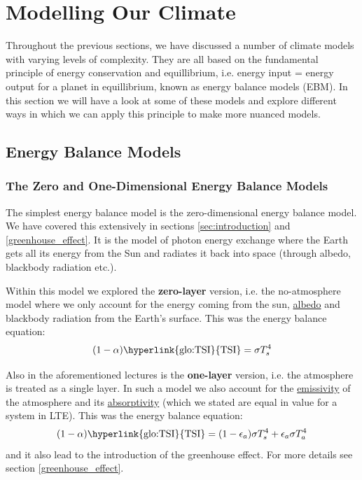 \section{Modelling Our Climate}
\label{sec:climate-modelling}

Throughout the previous sections, we have discussed a number of climate models
with varying levels of complexity. They are all based on the fundamental
principle of energy conservation and equillibrium, i.e. energy input = energy
output for a planet in equillibrium, known as energy balance models (\gls{EBM}).
In this section we will have a look at some
of these models and explore different ways in which we can apply this principle 
to make more nuanced models.

\subsection{Energy Balance Models}
\label{sec:EBM}

\subsubsection{The Zero and One-Dimensional Energy Balance Models}
\label{sec:0D-1D-EBM}

The simplest energy balance model is the zero-dimensional energy balance model. 
We have covered this extensively in sections \ref{sec:introduction} and 
\ref{greenhouse_effect}. It is the model of photon energy exchange where the Earth
gets all its energy from the Sun and radiates it back into space (through albedo,
blackbody radiation etc.). 

Within this model we explored the \textbf{zero-layer} version, i.e. the no-atmosphere
model where we only account for the energy coming from the sun, 
\hyperlink{glo:albedo}{albedo} and blackbody radiation from the Earth's surface.
This was the energy balance equation:
$$
(1-\alpha) \text{\hyperlink{glo:TSI}{TSI}} = \sigma T_s^4
$$

Also in the aforementioned lectures is the \textbf{one-layer} version, i.e. the
atmosphere is treated as a single layer. In such a model we also account for the
\hyperlink{glo:emissivity}{emissivity} of the atmosphere and its 
\hyperlink{glo:absorptivity}{absorptivity} (which we stated are
equal in value for a system in \gls{LTE}). This was the energy balance equation:
$$
(1-\alpha) \text{\hyperlink{glo:TSI}{TSI}} = (1-\epsilon_a)\sigma T_s^4 + 
\epsilon_a\sigma T_a^4
$$
and it also lead to the introduction of the greenhouse effect. For more details 
see section \ref{greenhouse_effect}.\\

